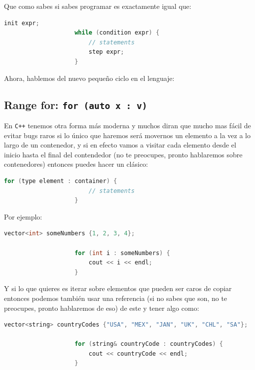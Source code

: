 \documentclass[12pt, fleqn]{report}                             %
\theoremstyle{break}                                            %
\newcommand{\textCode}[1]  { \texttt{#1} }                      %
\newcommand \Cpp  {\textCode{C++} }                               %
\begin{document}
                Que como sabes si sabes programar es exactamente igual que:
                \begin{lstlisting}[language=C++, gobble=20]
                    init expr;
                    while (condition expr) {
                        // statements
                        step expr;
                    }
                \end{lstlisting}

                Ahora, hablemos del nuevo pequeño ciclo en el lenguaje:

            \subsection{Range for: \textCode{for (auto x : v)}}

                En \Cpp tenemos otra forma más moderna y muchos diran que mucho mas
                fácil de evitar bugs raros si lo único que haremos será movernos un 
                elemento a la vez a lo largo de un contenedor, y si en efecto vamos a visitar cada
                elemento desde el inicio hasta el final del contendedor (no te preocupes, pronto
                hablaremos sobre contenedores) entonces puedes hacer un clásico:
                \begin{lstlisting}[language=C++, gobble=20]
                    for (type element : container) {
                        // statements
                    }
                \end{lstlisting}

                Por ejemplo:
                \begin{lstlisting}[language=C++, gobble=20]
                    vector<int> someNumbers {1, 2, 3, 4};

                    for (int i : someNumbers) {
                        cout << i << endl;
                    }
                \end{lstlisting}

                Y si lo que quieres es iterar sobre elementos que pueden ser caros de copiar entonces
                podemos también usar una referencia (si no sabes que son, no te preocupes, pronto hablaremos de eso)
                de este y tener algo como:
                \begin{lstlisting}[language=C++, gobble=20]
                    vector<string> countryCodes {"USA", "MEX", "JAN", "UK", "CHL", "SA"};

                    for (string& countryCode : countryCodes) {
                        cout << countryCode << endl;
                    }
                \end{lstlisting}
\end{document}
